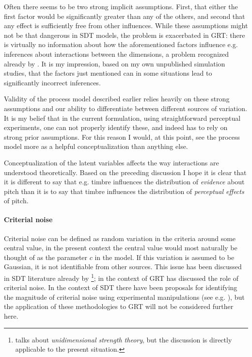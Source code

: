 \documentclass{article}\usepackage{knitr}
\begin{document}
Often there seems to be two strong implicit assumptions. First, that either the first factor would be significantly greater than any of the others, and second that any effect is sufficiently free from other influences. While these assumptions might not be that dangerous in SDT models, the problem is exacerbated in GRT: there is virtually no information about how the aforementioned factors influence e.g. inferences about interactions between the dimensions, a problem recognized already by \citet{silbert2009}. It is my impression, based on my own unpublished simulation studies, that the factors just mentioned can in some situations lead to significantly incorrect inferences. 

Validity of the process model described earlier relies heavily on these strong assumptions and our ability to differentiate between different sources of variation. It is my belief that in the current formulation, using straightforward perceptual experiments, one can not properly identify these, and indeed has to rely on strong prior assumptions. For this reason I would, at this point, see the process model more as a helpful conceptualization than anything else.

Conceptualization of the latent variables affects the way interactions are understood theoretically. Based on the preceding discussion I hope it is clear that it is different to say that e.g. timbre influences the distribution of \textit{evidence} about pitch than it is to say that timbre influences the distribution of \textit{perceptual effects} of pitch.

\paragraph{Criterial noise}

Criterial noise can be defined as random variation in the criteria around some central value, in the present context the central value would most naturally be thought of as the parameter $c$ in the model. If this variation is assumed to be Gaussian, it is not identifiable from other sources. This issue has been discussed in SDT literature already by \cite{wickelgren1968}\footnote{\cite{wickelgren1968} talks about \textit{unidimensional strength theory}, but the discussion is directly applicable to the present situation.}; in the context of GRT \citet{ashby2000} has discussed the role of criterial noise. In the context of SDT there have been proposals for identifying the magnitude of criterial noise using experimental manipulations (see e.g. \citealt{kellen2012, benjamin2009, cabrera2015}), but the application of these methodologies to GRT will not be considered further here. 
\end{document}
